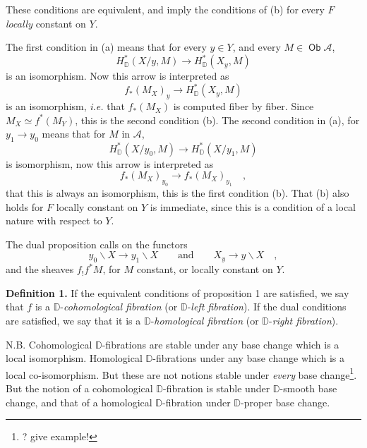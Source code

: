 \documentclass[11pt]{article}
\newcommand{\printedpage}[1]{\marginpar{\footnotesize p.~#1}}
\newcommand{\msp}[1]{\marginpar{\footnotesize [#1]}}
\newcommand{\D}{\mathbb{D}}
\newcommand{\Ob}{\mathop{\mathsf{Ob}}}
\newcommand{\bs}{\backslash}
\begin{document}
These conditions are equivalent, and imply the conditions of (b) for every $F$ \textit{locally} constant on $Y$.

The first condition in (a) means that for every $y \in Y$, and every $M \in \Ob \mathcal{A}$,
\[
H^*_{\D}(X/y, M) \longrightarrow H^*_{\D}(X_y, M)
\]
is an isomorphism. Now this arrow is interpreted as
\[
f_*(M_X)_y \longrightarrow H^*_{\D}(X_y, M)
\]
is an isomorphism, \textit{i.e.} that $f_*(M_X)$ is computed fiber by fiber. Since $M_X \simeq f^*(M_Y)$, this is the second condition (b). The second condition in (a), for $y_1 \to y_0$ means that for $M$ in $\mathcal{A}$,
\[
H^*_{\D}(X/y_0, M) \longrightarrow H^*_{\D}(X/y_1, M)
\]
is isomorphism, now this arrow is interpreted as
\[
f_*(M_X)_{y_0} \longrightarrow f_*(M_X)_{y_1} \quad ,
\]
that this is always an isomorphism, this is the first condition (b). That (b) also holds for $F$ locally constant on $Y$ is immediate, since this is a condition of a local nature with respect to $Y$.

\msp{page 77}

The dual proposition calls on the functors
\[
y_0\bs X \longrightarrow y_1\bs X \qquad \text{and} \qquad X_y \longrightarrow y\bs X \quad ,
\]
and the sheaves $f_!f^*M$, for $M$ constant, or locally constant on $Y$.

\printedpage{47}
\textbf{Definition 1.} If the equivalent conditions of proposition 1 are satisfied, we say that $f$ is a $\D$-\textit{cohomological fibration} (or $\D$-\textit{left fibration}). If the dual conditions are satisfied, we say that it is a $\D$-\textit{homological fibration} (or $\D$-\textit{right fibration}).

N.B. Cohomological $\D$-fibrations are stable under any base change which is a local isomorphism. Homological $\D$-fibrations under any base change which is a local co-isomorphism. But these are not notions stable under \textit{every} base change\footnote[34]{? give example!}. But the notion of a cohomological $\D$-fibration is stable under $\D$-smooth base change, and that of a homological $\D$-fibration under $\D$-proper base change.
\end{document}
